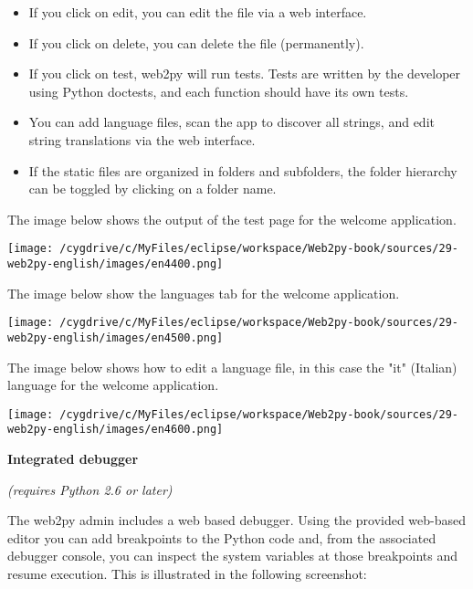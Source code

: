 \documentclass[justified,sixbynine,notoc]{tufte-book}
\begin{document}
\begin{fullwidth}
\begin{itemize}
\item If you click on edit, you can edit the file via a web interface.

\item If you click on delete, you can delete the file (permanently).

\item If you click on test, web2py will run tests. Tests are written by the developer using Python doctests, and each function should have its own tests.

\item You can add language files, scan the app to discover all strings, and edit string translations via the web interface.

\item If the static files are organized in folders and subfolders, the folder hierarchy can be toggled by clicking on a folder name.
\end{itemize}

The image below shows the output of the test page for the welcome application.


\goodbreak\begin{center}\texttt{[image: /cygdrive/c/MyFiles/eclipse/workspace/Web2py-book/sources/29-web2py-english/images/en4400.png]}\end{center}


The image below show the languages tab for the welcome application.


\goodbreak\begin{center}\texttt{[image: /cygdrive/c/MyFiles/eclipse/workspace/Web2py-book/sources/29-web2py-english/images/en4500.png]}\end{center}


The image below shows how to edit a language file, in this case the "it" (Italian) language for the welcome application.


\goodbreak\begin{center}\texttt{[image: /cygdrive/c/MyFiles/eclipse/workspace/Web2py-book/sources/29-web2py-english/images/en4600.png]}\end{center}


{\bf Integrated debugger}

{\it (requires Python 2.6 or later)}

The web2py admin includes a web based debugger. Using the provided web-based editor you can add breakpoints to the Python code and, from the associated debugger console, you can inspect the system variables at those breakpoints and resume execution. This is illustrated in the following screenshot:



\end{fullwidth}
\end{document}
